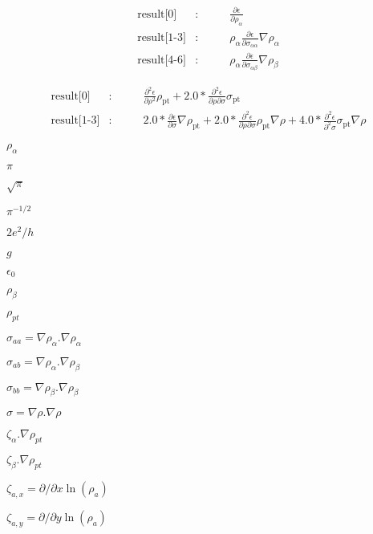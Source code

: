 \documentclass{article}
\begin{document}
\begin{eqnarray*}
    \mbox{result[0]}    &:& \qquad \frac{\partial \epsilon}{\partial \rho_{\alpha}} \\
    \mbox{result[1-3]}  &:& \qquad \rho_\alpha \frac{\partial \epsilon}{\partial \sigma_{\alpha \alpha}} \nabla\rho_\alpha\\
    \mbox{result[4-6]}  &:& \qquad \rho_\alpha \frac{\partial \epsilon}{\partial \sigma_{\alpha \beta}} \nabla\rho_\beta
\end{eqnarray*}
\pagebreak

\begin{eqnarray*}
    \mbox{result[0]}    &:& \qquad \frac{\partial^2 \epsilon}{\partial \rho^2} \rho_\mathrm{pt}
                            + 2.0 * \frac{\partial^2 \epsilon}{\partial \rho\partial\sigma}\sigma_\mathrm{pt}\\
    \mbox{result[1-3]}  &:& \qquad 2.0 * \frac{\partial\epsilon}{\partial\sigma}\nabla\rho_\mathrm{pt}
                            + 2.0 * \frac{\partial^2\epsilon}{\partial\rho\partial\sigma} \rho_\mathrm{pt}\nabla\rho
                            + 4.0 * \frac{\partial^2\epsilon}{\partial^2\sigma} \sigma_\mathrm{pt}\nabla\rho
\end{eqnarray*}
\pagebreak

$ \rho_\alpha $
\pagebreak

$\pi$
\pagebreak

$\sqrt{\pi}$
\pagebreak

$\pi^{-1/2}$
\pagebreak

$ 2e^2/h $
\pagebreak

$ g $
\pagebreak

$\epsilon_0$
\pagebreak

$ \rho_\beta $
\pagebreak

$ \rho_{pt} $
\pagebreak

$ \sigma_{aa} = \nabla \rho_{\alpha}.\nabla \rho_{\alpha} $
\pagebreak

$ \sigma_{ab} = \nabla \rho_{\alpha}.\nabla \rho_{\beta} $
\pagebreak

$ \sigma_{bb} = \nabla \rho_{\beta}.\nabla \rho_{\beta} $
\pagebreak

$ \sigma = \nabla \rho.\nabla \rho $
\pagebreak

$ \zeta_{\alpha}.\nabla\rho_{pt} $
\pagebreak

$ \zeta_{\beta}.\nabla\rho_{pt} $
\pagebreak

$ \zeta_{a,x}=\partial/{\partial x} \ln(\rho_a)  $
\pagebreak

$ \zeta_{a,y}=\partial/{\partial y} \ln(\rho_a)  $
\pagebreak
\end{document}
